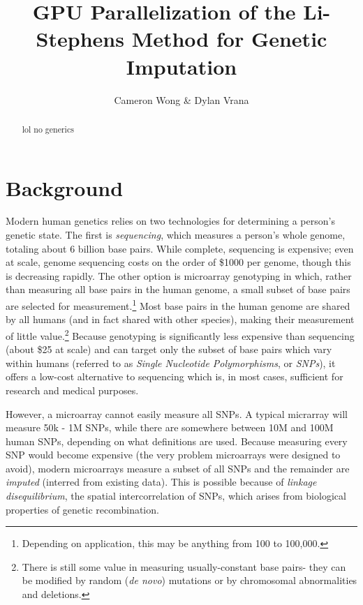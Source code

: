 \documentclass[12pt]{article}
\title{GPU Parallelization of the Li-Stephens Method for Genetic Imputation}
\author{Cameron Wong \& Dylan Vrana}
\begin{document}
\maketitle

\begin{abstract}

lol no generics

\end{abstract}

\section{Background}

Modern human genetics relies on two technologies for determining a person's genetic state.  The first is \textit{sequencing}, which measures a person's whole genome, totaling about 6 billion base pairs.  While complete, sequencing is expensive; even at scale, genome sequencing costs on the order of \$1000 per genome, though this is decreasing rapidly.  The other option is microarray genotyping in which, rather than measuring all base pairs in the human genome, a small subset of base pairs are selected for measurement.\footnote{Depending on application, this may be anything from 100 to 100,000.}  Most base pairs in the human genome are shared by all humans (and in fact shared with other species), making their measurement of little value.\footnote{There is still some value in measuring usually-constant base pairs- they can be modified by random (\textit{de novo}) mutations or by chromosomal abnormalities and deletions.}  Because genotyping is significantly less expensive than sequencing (about \$25 at scale) and can target only the subset of base pairs which vary within humans (referred to as \textit{Single Nucleotide Polymorphisms}, or \textit{SNPs}), it offers a low-cost alternative to sequencing which is, in most cases, sufficient for research and medical purposes.

However, a microarray cannot easily measure all SNPs.  A typical micrarray will measure 50k - 1M SNPs, while there are somewhere between 10M and 100M human SNPs, depending on what definitions are used.  Because measuring every SNP would become expensive (the very problem microarrays were designed to avoid), modern microarrays measure a subset of all SNPs and the remainder are \textit{imputed} (interred from existing data).  This is possible because of \textit{linkage disequilibrium}, the spatial intercorrelation of SNPs, which arises from biological properties of genetic recombination.
\end{document}
